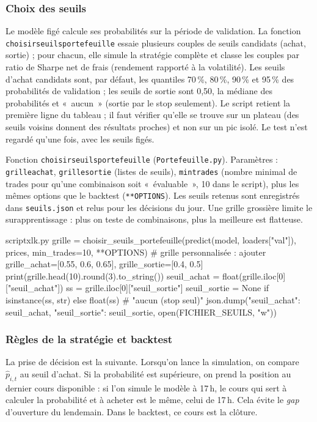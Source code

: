 \documentclass[11pt,a4paper]{article}
\renewcommand{\_}{\usorig\allowbreak}   %
\newcommand{\f}[1]{\texttt{#1}}        %
\begin{document}
\subsubsection{Choix des seuils}\label{sec:seuils}
Le modèle figé calcule ses probabilités sur la période de validation. La fonction
\f{choisir\_seuils\_portefeuille} essaie plusieurs couples de seuils candidats (achat,
sortie) ; pour chacun, elle simule la stratégie complète et classe les couples par
ratio de Sharpe net de frais (rendement rapporté à la volatilité). Les seuils d'achat
candidats sont, par défaut, les quantiles 70\,\%, 80\,\%, 90\,\% et 95\,\% des probabilités
de validation ; les seuils de sortie sont 0,50, la médiane des probabilités et
«~aucun~» (sortie par le stop seulement). Le script retient la première ligne du
tableau ; il faut vérifier qu'elle se trouve sur un plateau (des seuils voisins donnent
des résultats proches) et non sur un pic isolé. Le test n'est regardé qu'une fois, avec
les seuils figés.

\begin{danslecode}
Fonction \f{choisir\_seuils\_portefeuille} (\f{Portefeuille.py}). Paramètres :
\f{grille\_achat}, \f{grille\_sortie} (listes de seuils), \f{min\_trades} (nombre minimal de
trades pour qu'une combinaison soit «~évaluable~», 10 dans le script), plus les mêmes
options que le backtest (\f{**OPTIONS}). Les seuils retenus sont enregistrés dans
\f{seuils.json} et relus pour les décisions du jour. Une grille grossière limite le
surapprentissage : plus on teste de combinaisons, plus la meilleure est flatteuse.
\end{danslecode}

\begin{code}{script\_xlk.py}
grille = choisir_seuils_portefeuille(predict(model, loaders["val"]), prices,
                                     min_trades=10, **OPTIONS)
# grille personnalisée : ajouter grille_achat=[0.55, 0.6, 0.65], grille_sortie=[0.4, 0.5]
print(grille.head(10).round(3).to_string())
seuil_achat  = float(grille.iloc[0]["seuil_achat"])
ss           = grille.iloc[0]["seuil_sortie"]
seuil_sortie = None if isinstance(ss, str) else float(ss)        # "aucun (stop seul)"
json.dump({"seuil_achat": seuil_achat, "seuil_sortie": seuil_sortie}, open(FICHIER_SEUILS, "w"))
\end{code}

\subsubsection{Règles de la stratégie et backtest}\label{sec:backtest}
La prise de décision est la suivante. Lorsqu'on lance la simulation, on compare
$\hat p_{i,t}$ au seuil d'achat. Si la probabilité est supérieure, on prend la position
au dernier cours disponible : si l'on simule le modèle à 17\,h, le cours qui sert à
calculer la probabilité et à acheter est le même, celui de 17\,h. Cela évite le
\emph{gap} d'ouverture du lendemain. Dans le backtest, ce cours est la clôture.
\end{document}
